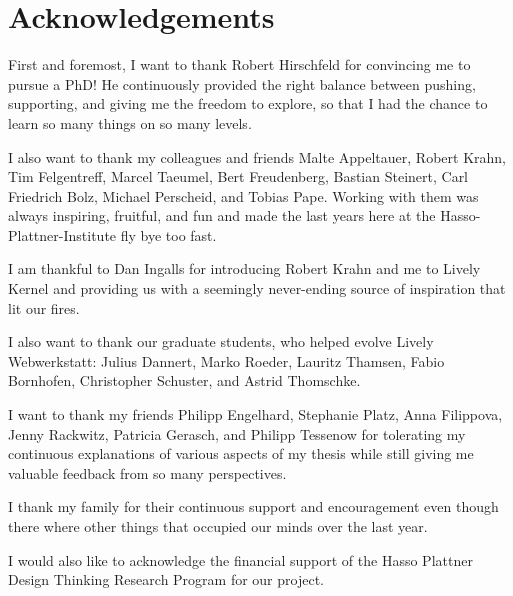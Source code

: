 \chapter*{Acknowledgements}


{\centering First and foremost, I want to thank Robert Hirschfeld for convincing me to pursue a PhD! He continuously provided the right balance between pushing, supporting, and giving me the freedom to explore, so that I had the chance to learn so many things on so many levels. }


\vspace{1ex}

{\centering I also want to thank my colleagues and friends  Malte Appeltauer, Robert Krahn,  Tim Felgentreff, Marcel Taeumel,  Bert Freudenberg,  Bastian Steinert, Carl Friedrich Bolz, Michael Perscheid, and Tobias Pape. Working with them was always inspiring, fruitful, and fun and made the last years here at the Hasso-Plattner-Institute fly bye too fast. }

\vspace{1ex}

{\centering I am thankful to Dan Ingalls for introducing Robert Krahn and me to Lively Kernel and providing us with a seemingly never-ending source of inspiration that lit our fires.  }

\vspace{1ex}

{\centering I also want to thank our graduate students, who helped evolve Lively Webwerkstatt: Julius Dannert, Marko Roeder, Lauritz Thamsen, Fabio Bornhofen, Christopher Schuster, and Astrid Thomschke. }

\vspace{1ex}

{\centering I want to thank my friends Philipp Engelhard, Stephanie Platz, Anna Filippova, Jenny Rackwitz, Patricia Gerasch, and Philipp Tessenow  for tolerating my continuous explanations of various aspects of my thesis while still giving me valuable feedback from so many perspectives. }

\vspace{1ex}

{\centering I thank my family for their continuous support and encouragement even though there where other things that occupied our minds over the last year. }

\vspace{1ex}

{\centering I would also like to acknowledge the financial support of the Hasso Plattner Design Thinking Research Program for our project.}

